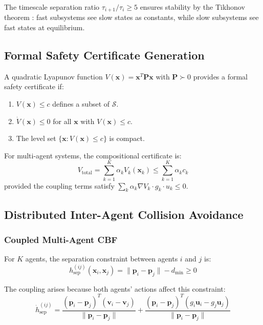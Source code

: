 \documentclass[12pt,a4paper,twocolumn]{article}
\newcommand{\cS}{\mathcal{S}}
\newcommand{\vect}[1]{\mathbf{#1}}
\newcommand{\mat}[1]{\mathbf{#1}}
\begin{document}
The timescale separation ratio $\tau_{i+1}/\tau_i \geq 5$ ensures stability by the Tikhonov theorem \citep{Khalil2002}: fast subsystems see slow states as constants, while slow subsystems see fast states at equilibrium.

\subsection{Formal Safety Certificate Generation}
\label{sec:formal}

A quadratic Lyapunov function $V(\vect{x}) = \vect{x}^T \mat{P} \vect{x}$ with $\mat{P} \succ 0$ provides a formal safety certificate if:
\begin{enumerate}[leftmargin=*]
    \item $V(\vect{x}) \leq c$ defines a subset of $\cS$.
    \item $\dot{V}(\vect{x}) \leq 0$ for all $\vect{x}$ with $V(\vect{x}) \leq c$.
    \item The level set $\{\vect{x} : V(\vect{x}) \leq c\}$ is compact.
\end{enumerate}

For multi-agent systems, the compositional certificate is:
\begin{equation}
    V_{\text{total}} = \sum_{k=1}^{K} \alpha_k V_k(\vect{x}_k) \leq \sum_{k=1}^{K} \alpha_k c_k
    \label{eq:compositional}
\end{equation}
provided the coupling terms satisfy $\sum_k \alpha_k \nabla V_k \cdot g_k \cdot u_k \leq 0$.

\subsection{Distributed Inter-Agent Collision Avoidance}
\label{sec:collision_avoidance}

\subsubsection{Coupled Multi-Agent CBF}
For $K$ agents, the separation constraint between agents $i$ and $j$ is:
\begin{equation}
    h_{\text{sep}}^{(ij)}(\vect{x}_i, \vect{x}_j) = \|\vect{p}_i - \vect{p}_j\| - d_{\min} \geq 0
    \label{eq:multi_sep}
\end{equation}

The coupling arises because both agents' actions affect this constraint:
\begin{equation}
    \dot{h}_{\text{sep}}^{(ij)} = \frac{(\vect{p}_i - \vect{p}_j)^T(\vect{v}_i - \vect{v}_j)}{\|\vect{p}_i - \vect{p}_j\|} + \frac{(\vect{p}_i - \vect{p}_j)^T(g_i\vect{u}_i - g_j\vect{u}_j)}{\|\vect{p}_i - \vect{p}_j\|}
    \label{eq:sep_dot}
\end{equation}
\end{document}
